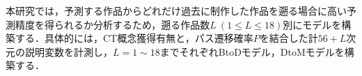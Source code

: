 \documentclass[submit]{ipsj}
\begin{document}




本研究では，予測する作品からどれだけ過去に制作した作品を遡る場合に高い予測精度を得られるか分析するため，遡る作品数$L~(1 \leq L \leq 18)$別にモデルを構築する．具体的には，CT概念獲得有無と，パス遷移確率$P$を結合した計$56+L$次元の説明変数を計測し，$L=1\sim18$までそれぞれBtoDモデル，DtoMモデルを構築する．

\end{document}

